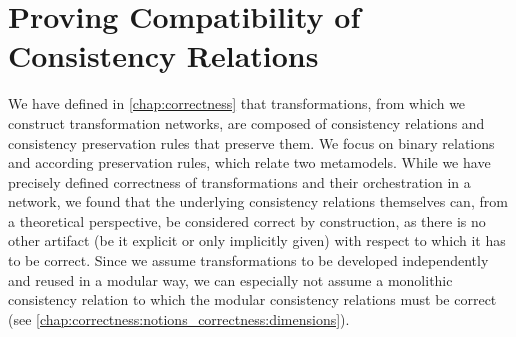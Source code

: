 \chapter{Proving Compatibility of Consistency Relations
}
\label{chap:compatibility}


We have defined in \autoref{chap:correctness} that transformations, from which we construct transformation networks, are composed of consistency relations and consistency preservation rules that preserve them.
We focus on binary relations and according preservation rules, which relate two metamodels.
While we have precisely defined correctness of transformations and their orchestration in a network, we
found that the underlying consistency relations themselves can, from a theoretical perspective, be considered correct by construction, as there is no other artifact (be it explicit or only implicitly given) with respect to which it has to be correct.
Since we assume transformations to be developed independently and reused in a modular way, we can especially not assume a monolithic consistency relation to which the modular consistency relations must be correct (see \autoref{chap:correctness:notions_correctness:dimensions}).

